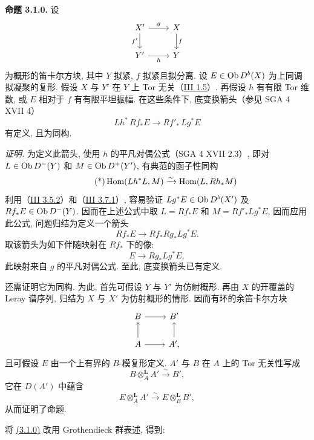 \textbf{命题 3.1.0.} 设
\[
\begin{tikzcd}
X' \arrow[r,"g"]\arrow[d,"f'"'] & X\arrow[d,"f"]\\
Y' \arrow[r,"h"'] & Y
\end{tikzcd}
\]
为概形的笛卡尔方块, 其中 \(Y\) 拟紧, \(f\) 拟紧且拟分离. 设 \(E\in\operatorname{Ob} D^b(X)\) 为上同调拟凝聚的复形. 假设 \(X\) 与 \(Y'\) 在 \(Y\) 上 Tor 无关（\hyperlink{sga6.e03.def.1-5}{III 1.5}）. 再假设 \(h\) 有有限 Tor 维数, 或 \(E\) 相对于 \(f\) 有有限平坦振幅. 在这些条件下, 底变换箭头（参见 SGA 4 XVII 4）
\[
 Lh^*\,Rf_*E\longrightarrow Rf'_*\,Lg^*E
\]
有定义, 且为同构.

\emph{证明.} 为定义此箭头, 使用 \(h\) 的平凡对偶公式（SGA 4 XVII 2.3）, 即对 \(L\in\operatorname{Ob} D^-(Y)\) 和 \(M\in\operatorname{Ob} D^+(Y')\), 有典范的函子性同构
\begin{equation}\tag{*}
 \operatorname{Hom}(Lh^*L,M)\xrightarrow{\sim}\operatorname{Hom}(L,Rh_*M)
\end{equation}
利用（\hyperlink{sga6.e03.cor.3-5-2}{III 3.5.2}）和（\hyperlink{sga6.e03.cor.3-7-1}{III 3.7.1}）, 容易验证 \(Lg^*E\in\operatorname{Ob} D^b(X')\) 及 \(Rf_*E\in\operatorname{Ob} D^-(Y)\). 因而在上述公式中取 \(L=Rf_*E\) 和 \(M=Rf'_*Lg^*E\), 因而应用此公式, 问题归结为定义一个箭头
\[
 Rf_*E\longrightarrow Rf_*Rg_*Lg^*E.
\]
取该箭头为如下伴随映射在 \(Rf_*\) 下的像:
\[
 E\longrightarrow Rg_*Lg^*E,
\]
此映射来自 \(g\) 的平凡对偶公式. 至此, 底变换箭头已有定义.

还需证明它为同构. 为此, 首先可假设 \(Y\) 与 \(Y'\) 为仿射概形. 再由 \(X\) 的开覆盖的 Leray 谱序列, 归结为 \(X\) 与 \(X'\) 为仿射概形的情形. 因而有环的余笛卡尔方块
\[
\begin{tikzcd}
B\arrow[r] & B'\\
A\arrow[u]\arrow[r] & A'\arrow[u],
\end{tikzcd}
\]
且可假设 \(E\) 由一个上有界的 \(B\)-模复形定义. \(A'\) 与 \(B\) 在 \(A\) 上的 Tor 无关性写成
\[
 B\otimes_A^{\mathbf L}A'\xrightarrow{\sim}B',
\]
它在 \(D(A')\) 中蕴含
\[
 E\otimes_A^{\mathbf L}A'\xrightarrow{\sim}E\otimes_B^{\mathbf L}B',
\]
从而证明了命题.

将 \hyperlink{sga6.e04.prop.3-1-0}{(3.1.0)} 改用 Grothendieck 群表述, 得到:

